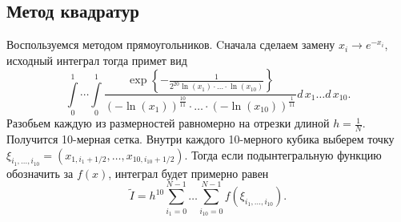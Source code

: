 \documentclass[12pt, a4paper]{article}
\begin{document}
\subsection{Метод квадратур}
Воспользуемся методом прямоугольников. Cначала сделаем замену $x_i \to e^{-x_i}$, исходный интеграл тогда примет вид 
\[
\int\limits_{0}^{1}\cdots\int\limits_{0}^{1} 
	\frac{ \exp\left\{ - \frac{1}{2^{20} \ln\left(x_1\right)\cdot \ldots \cdot \ln\left( x_{10}\right) } \right\} } 
	 { \left( -\ln\left( x_1 \right) \right) ^\frac{10}{11}\cdot\ldots\cdot\left( - \ln\left( x_{10} \right)\right)^\frac{1}{11} }
	d\,x_1 \ldots d\,x_{10}.
\]
Разобьем каждую из размерностей равномерно на отрезки длиной $h = \frac 1N$. Получится 10-мерная сетка. Внутри каждого 10-мерного кубика %
выберем точку $\xi_{i_1,\ldots,i_{10}} = (x_{1,i_1+1/2},\ldots,x_{10,i_{10}+1/2})$. Тогда если подынтегральную функцию обозначить за $f(x)$, интеграл будет примерно равен 
\[ \tilde{I} = h^{10}\sum\limits_{i_1 = 0}^{N-1}\dots\sum\limits_{i_{10} = 0}^{N-1} f\left(\xi_{i_1,\ldots,i_{10}}\right).\]
\end{document}
